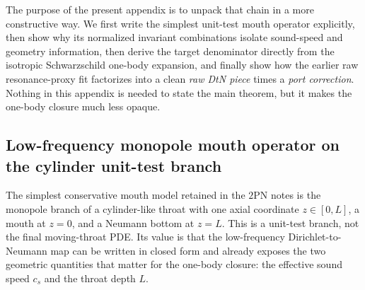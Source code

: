 \documentclass[11pt]{article}
\newcommand{\TwoPN}{\mathrm{2PN}}
\begin{document}
The purpose of the present appendix is to unpack that chain in a more constructive
way.  We first write the simplest unit-test mouth operator explicitly, then show why
its normalized invariant combinations isolate sound-speed and geometry information,
then derive the target denominator directly from the isotropic Schwarzschild
one-body expansion, and finally show how the earlier raw resonance-proxy fit
factorizes into a clean \emph{raw DtN piece} times a \emph{port correction}.
Nothing in this appendix is needed to state the main theorem, but it makes the
one-body closure much less opaque.

\subsection{Low-frequency monopole mouth operator on the cylinder unit-test branch}
\label{app:one-body-dtn-cylinder}

The simplest conservative mouth model retained in the \(\TwoPN\) notes is the
monopole branch of a cylinder-like throat with one axial coordinate \(z\in[0,L]\),
a mouth at \(z=0\), and a Neumann bottom at \(z=L\).  This is a unit-test branch,
not the final moving-throat PDE.  Its value is that the low-frequency Dirichlet-to-
Neumann map can be written in closed form and already exposes the two geometric
quantities that matter for the one-body closure: the effective sound speed \(c_s\)
and the throat depth \(L\).
\end{document}
